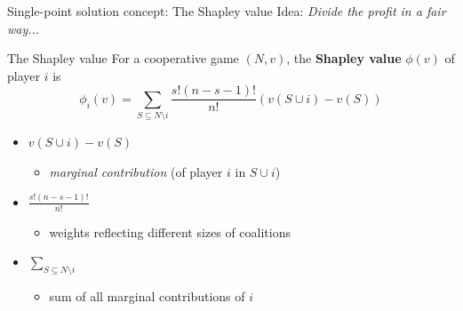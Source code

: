 \documentclass{beamer}
\begin{document}
\begin{frame}{Single-point solution concept: The Shapley value}
    Idea: \textit{Divide the profit in a fair way...}
	\pause
    \begin{block}{The Shapley value}
		\pause
        For a cooperative game $(N,v)$, the \textbf{Shapley value} $\phi(v)$ of player $i$ is
        \[
        \phi_i(v) = \sum_{S \subseteq N \setminus i}\frac{s!(n-s-1)!}{n!}\left(v(S \cup i) - v(S)\right)
        \]
    \end{block}
    \begin{itemize}
        \item<4-> $v(S\cup i)-v(S)$
        \begin{itemize}
            \item<5-> \textit{marginal contribution} (of player $i$ in $S \cup i$)
        \end{itemize}
        \item<6-> $\frac{s!(n-s-1)!}{n!}$ 
        \begin{itemize}
            \item<7-> weights reflecting different sizes of coalitions
        \end{itemize}
        \item<8-> $\sum_{S \subseteq N \setminus i}$
        \begin{itemize}
            \item<9-> sum of all marginal contributions of $i$
        \end{itemize}
    \end{itemize}
\end{frame}


\end{document}
